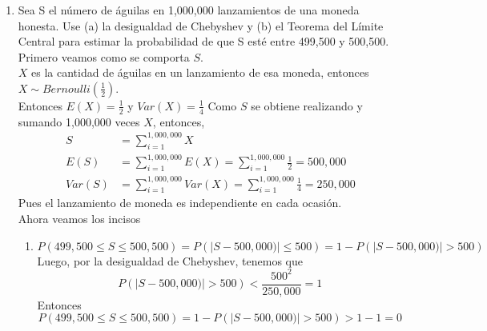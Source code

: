 \documentclass[11pt,a4paper]{report}
\begin{document}
\begin{enumerate}
		\item{
		Sea S el número de águilas en 1,000,000 lanzamientos de una moneda
        honesta. Use (a) la desigualdad de Chebyshev y (b) el Teorema del
        Límite Central para estimar la probabilidad de que S esté entre 499,500
        y 500,500.\\
        Primero veamos como se comporta $S$.\\
        $X$ es la cantidad de águilas en un lanzamiento de esa moneda, entonces
        $X \sim Bernoulli(\frac{1}{2})$.\\
        Entonces $E(X) = \frac{1}{2}$ y $Var(X) = \frac{1}{4}$
        Como $S$ se obtiene realizando y sumando 1,000,000 veces $X$, entonces,
        \begin{align*}
            S &= \sum_{i=1}^{1,000,000}{X}\\
            E(S) &= \sum_{i=1}^{1,000,000}{E(X)}
            = \sum_{i=1}^{1,000,000}{\frac{1}{2}}
            =500,000\\
            Var(S)&= \sum_{i=1}^{1,000,000}{Var(X)}
            = \sum_{i=1}^{1,000,000}{\frac{1}{4}}
            = 250,000
        \end{align*}
        Pues el lanzamiento de moneda es independiente en cada ocasión.\\
        Ahora veamos los incisos
        \begin{enumerate}
            \item {
            \[P(499,500\leq S\leq
             500,500)=P(|S-500,000)|\leq500)=1-P(|S-500,000)|>500)\]
            Luego, por la desigualdad de Chebyshev, tenemos que
            \[P(|S-500,000)|> 500)<\frac{500^2}{250,000} = 1\]
            Entonces
            \[P(499,500\leq S\leq 500,500)=1-P(|S-500,000)|>500)>1 - 1 = 0\]
            }


\end{enumerate}}
\end{enumerate}
\end{document}
